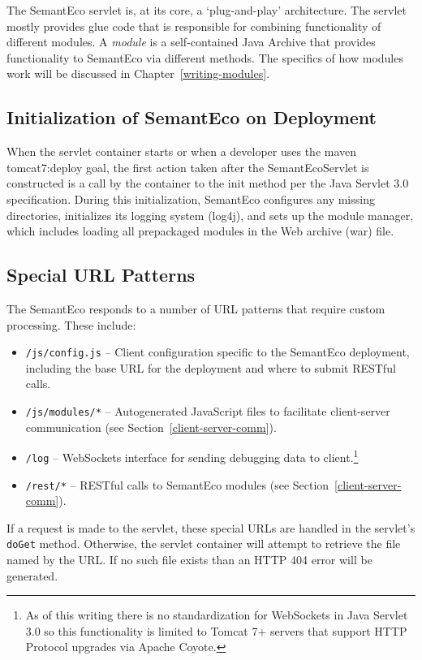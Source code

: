 \documentclass[letterpaper]{report}
\begin{document}
The SemantEco servlet is, at its core, a `plug-and-play' architecture. The servlet mostly provides glue code that is responsible for combining functionality of different modules. A \textit{module} is a self-contained Java Archive that provides functionality to SemantEco via different methods. The specifics of how modules work will be discussed in Chapter~\ref{writing-modules}.

\subsection{Initialization of SemantEco on Deployment} 
When the servlet container starts or when a developer uses the maven tomcat7:deploy goal, the first action taken after the SemantEcoServlet is constructed is a call by the container to the init method per the Java Servlet 3.0 specification. During this initialization, SemantEco configures any missing directories, initializes its logging system (log4j), and sets up the module manager, which includes loading all prepackaged modules in the Web archive (war) file.

\subsection{Special URL Patterns}
\label{url-patterns}
The SemantEco responds to a number of URL patterns that require custom processing. These include:
\begin{itemize}
\item \texttt{/js/config.js} -- Client configuration specific to the SemantEco deployment, including the base URL for the deployment and where to submit RESTful calls.
\item \texttt{/js/modules/*} -- Autogenerated JavaScript files to facilitate client-server communication (see Section~\ref{client-server-comm}).
\item \texttt{/log} -- WebSockets interface for sending debugging data to client.\footnote{As of this writing there is no standardization for WebSockets in Java Servlet 3.0 so this functionality is limited to Tomcat 7+ servers that support HTTP Protocol upgrades via Apache Coyote.}
\item \texttt{/rest/*} -- RESTful calls to SemantEco modules (see Section~\ref{client-server-comm}).
\end{itemize}

\noindent If a request is made to the servlet, these special URLs are handled in the servlet's \texttt{doGet} method. Otherwise, the servlet container will attempt to retrieve the file named by the URL. If no such file exists than an HTTP 404 error will be generated.
\end{document}
